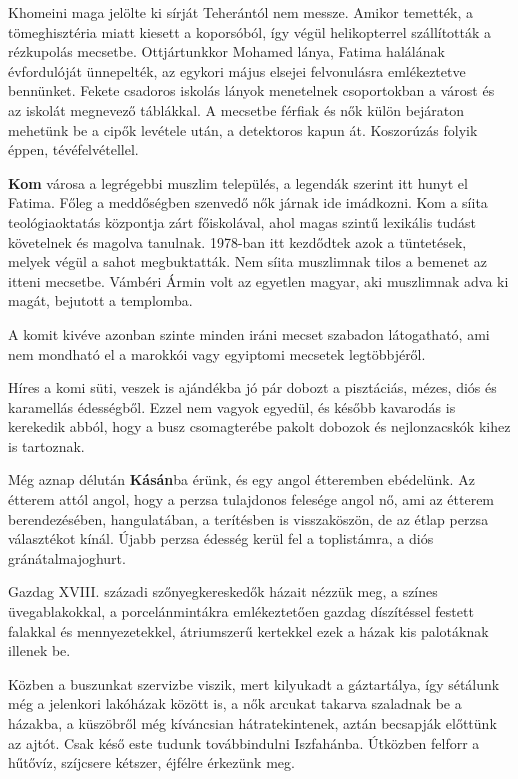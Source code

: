 Khomeini maga jelölte ki sírját Teherántól nem messze. Amikor
temették, a tömeghisztéria miatt kiesett a koporsóból, így végül
helikopterrel szállították a rézkupolás mecsetbe. Ottjártunkkor
Mohamed lánya, Fatima halálának évfordulóját ünnepelték, az egykori
május elsejei felvonulásra emlékeztetve bennünket. Fekete csadoros
iskolás lányok menetelnek csoportokban a várost és az iskolát megnevező
táblákkal. A mecsetbe férfiak és nők külön bejáraton mehetünk
be a cipők levétele után, a detektoros kapun át. Koszorúzás folyik
éppen, tévéfelvétellel.

\textbf{Kom} városa a legrégebbi muszlim település, a legendák szerint itt
hunyt el Fatima. Főleg a meddőségben szenvedő nők járnak ide imádkozni.
Kom a síita teológiaoktatás központja zárt főiskolával, ahol magas
szintű lexikális tudást követelnek és magolva tanulnak. 1978-ban
itt kezdődtek azok a tüntetések, melyek végül a sahot megbuktatták.
Nem síita muszlimnak tilos a bemenet az itteni mecsetbe. Vámbéri
Ármin volt az egyetlen magyar, aki muszlimnak adva ki magát, bejutott
a templomba.

A komit kivéve azonban szinte minden iráni mecset szabadon látogatható,
ami nem mondható el a marokkói vagy egyiptomi mecsetek
legtöbbjéről.

Híres a komi süti, veszek is ajándékba jó pár dobozt a pisztáciás,
mézes, diós és karamellás édességből. Ezzel nem vagyok egyedül, és
később kavarodás is kerekedik abból, hogy a busz csomagterébe pakolt
dobozok és nejlonzacskók kihez is tartoznak.

Még aznap délután \textbf{Kásán}ba érünk, és egy angol étteremben
ebédelünk. Az étterem attól angol, hogy a perzsa tulajdonos felesége angol
nő, ami az étterem berendezésében, hangulatában, a terítésben is visszaköszön,
de az étlap perzsa választékot kínál. Újabb perzsa édesség
kerül fel a toplistámra, a diós gránátalmajoghurt.

Gazdag XVIII. századi szőnyegkereskedők házait nézzük meg,
a színes üvegablakokkal, a porcelánmintákra emlékeztetően gazdag
díszítéssel festett falakkal és mennyezetekkel, átriumszerű kertekkel
ezek a házak kis palotáknak illenek be.

Közben a buszunkat szervizbe viszik, mert kilyukadt a gáztartálya,
így sétálunk még a jelenkori lakóházak között is, a nők arcukat
takarva szaladnak be a házakba, a küszöbről még kíváncsian hátratekintenek,
aztán becsapják előttünk az ajtót. Csak késő este tudunk
továbbindulni Iszfahánba. Útközben felforr a hűtővíz, szíjcsere kétszer,
éjfélre érkezünk meg.

